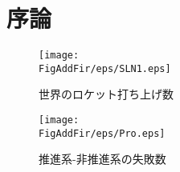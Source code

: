 \chapter{序論}
\newcommand{\FigAddFir}{./src/Chapter1/Figure}




\begin{figure}
\centering
\texttt{[image: \\FigAddFir/eps/SLN1.eps]}
\caption{世界のロケット打ち上げ数}
\label{fig:Success/Failure}
\end{figure}
\begin{figure}
\centering
\texttt{[image: \\FigAddFir/eps/Pro.eps]}
\caption{推進系-非推進系の失敗数}
\label{fig:ProFail}
\end{figure}
